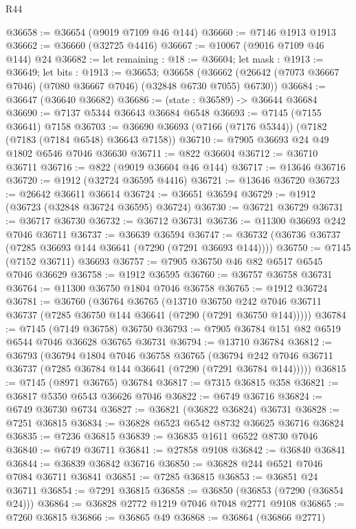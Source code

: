 \begin{lexlean}{R44}
\begin{coremodule}
{@36658 := @36654 (@9019 @7109 @46 @144)
@36660 := @7146 @1913 @1913
@36662 := @36660 (@32725 @4416)
@36667 := @10067 (@9016 @7109 @46 @144) @24
@36682 := let remaining : @18 := @36604;
  let mask : @1913 := @36649;
  let bits : @1913 := @36653;
  @36658 (@36662 (@26642 (@7073 @36667 @7046) (@7080 @36667 @7046) (@32848 @6730 @7055) @6730))
@36684 := @36647 (@36640 @36682)
@36686 := (state : @36589) -> @36644 @36684
@36690 := @7137 @5344 @36643 @36684 @6548
@36693 := @7145 (@7155 @36641) @7158
@36703 := @36690 @36693 (@7166 (@7176 @5344)) (@7182 (@7183 (@7184 @6548) @36643 @7158))
@36710 := @7905 @36693 @24 @49 @1802 @6546 @7046 @36630
@36711 := @822 @36604
@36712 := @36710 @36711
@36716 := @822 (@9019 @36604 @46 @144)
@36717 := @13646 @36716
@36720 := @1912 (@32724 @36595 @4416)
@36721 := @13646 @36720
@36723 := @26642 @36611 @36614
@36724 := @36651 @36594
@36729 := @1912 (@36723 (@32848 @36724 @36595) @36724)
@36730 := @36721 @36729
@36731 := @36717 @36730
@36732 := @36712 @36731
@36736 := @11300 @36693 @242 @7046 @36711
@36737 := @36639 @36594
@36747 := @36732 (@36736 @36737 (@7285 @36693 @144 @36641 (@7290 (@7291 @36693 @144))))
@36750 := @7145 (@7152 @36711) @36693
@36757 := @7905 @36750 @46 @82 @6517 @6545 @7046 @36629
@36758 := @1912 @36595
@36760 := @36757 @36758 @36731
@36764 := @11300 @36750 @1804 @7046 @36758
@36765 := @1912 @36724
@36781 := @36760
    (@36764
      @36765
      (@13710
        @36750
        @242
        @7046
        @36711
        @36737
        (@7285 @36750 @144 @36641 (@7290 (@7291 @36750 @144)))))
@36784 := @7145 (@7149 @36758) @36750
@36793 := @7905 @36784 @151 @82 @6519 @6544 @7046 @36628 @36765 @36731
@36794 := @13710 @36784
@36812 := @36793
    (@36794
      @1804
      @7046
      @36758
      @36765
      (@36794 @242 @7046 @36711 @36737 (@7285 @36784 @144 @36641 (@7290 (@7291 @36784 @144)))))
@36815 := @7145 (@8971 @36765) @36784
@36817 := @7315 @36815 @358
@36821 := @36817 @5350 @6543 @36626 @7046
@36822 := @6749 @36716
@36824 := @6749 @36730 @6734
@36827 := @36821 (@36822 @36824) @36731
@36828 := @7251 @36815
@36834 := @36828 @6523 @6542 @8732 @36625 @36716 @36824
@36835 := @7236 @36815
@36839 := @36835 @1611 @6522 @8730 @7046
@36840 := @6749 @36711
@36841 := @27858 @9108
@36842 := @36840 @36841
@36844 := @36839 @36842 @36716
@36850 := @36828 @244 @6521 @7046 @7084 @36711 @36841
@36851 := @7285 @36815
@36853 := @36851 @24 @36711
@36854 := @7291 @36815
@36858 := @36850 (@36853 (@7290 (@36854 @24)))
@36864 := @36828 @2772 @1219 @7046 @7048 @2771 @9108
@36865 := @7260 @36815
@36866 := @36865 @49
@36868 := @36864 (@36866 @2771)
}
\end{coremodule}
\end{lexlean}
